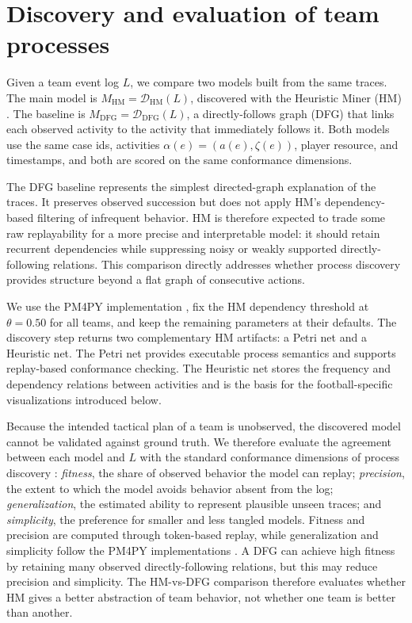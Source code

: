 \section{Discovery and evaluation of team processes}

Given a team event log $L$, we compare two models built from the same traces. The main model is $M_{\mathrm{HM}}=\mathcal{D}_{\mathrm{HM}}(L)$, discovered with the Heuristic Miner (HM) \cite{Weijters2006,Ayutaya2012}. The baseline is $M_{\mathrm{DFG}}=\mathcal{D}_{\mathrm{DFG}}(L)$, a directly-follows graph (DFG) that links each observed activity to the activity that immediately follows it. Both models use the same case ids, activities $\alpha(e)=(a(e),\zeta(e))$, player resource, and timestamps, and both are scored on the same conformance dimensions.

The DFG baseline represents the simplest directed-graph explanation of the traces. It preserves observed succession but does not apply HM's dependency-based filtering of infrequent behavior. HM is therefore expected to trade some raw replayability for a more precise and interpretable model: it should retain recurrent dependencies while suppressing noisy or weakly supported directly-following relations. This comparison directly addresses whether process discovery provides structure beyond a flat graph of consecutive actions.

We use the PM4PY implementation \cite{Berti2019}, fix the HM dependency threshold at $\theta=0.50$ for all teams, and keep the remaining parameters at their defaults. The discovery step returns two complementary HM artifacts: a Petri net and a Heuristic net. The Petri net provides executable process semantics and supports replay-based conformance checking. The Heuristic net stores the frequency and dependency relations between activities and is the basis for the football-specific visualizations introduced below.

Because the intended tactical plan of a team is unobserved, the discovered model cannot be validated against ground truth. We therefore evaluate the agreement between each model and $L$ with the standard conformance dimensions of process discovery \cite{Buijs2014,Syring2019}: \emph{fitness}, the share of observed behavior the model can replay; \emph{precision}, the extent to which the model avoids behavior absent from the log; \emph{generalization}, the estimated ability to represent plausible unseen traces; and \emph{simplicity}, the preference for smaller and less tangled models. Fitness and precision are computed through token-based replay, while generalization and simplicity follow the PM4PY implementations \cite{Buijs2014}. A DFG can achieve high fitness by retaining many observed directly-following relations, but this may reduce precision and simplicity. The HM-vs-DFG comparison therefore evaluates whether HM gives a better abstraction of team behavior, not whether one team is better than another.

